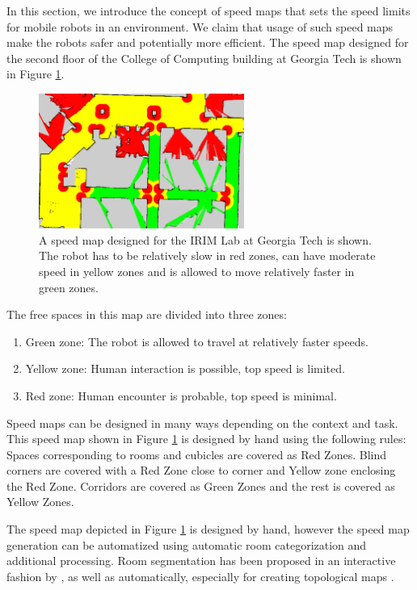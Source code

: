 In this section, we introduce the concept of speed maps that sets the speed limits for mobile robots in an environment. We claim that usage of such speed maps make the robots safer and potentially more efficient. The speed map designed for the second floor of the College of Computing building at Georgia Tech is shown in Figure \ref{fig:speed_map_irim}.

\begin{figure}[ht!]
\centering
\includegraphics[width=0.6\textwidth]{pics/intro}
\caption{A speed map designed for the IRIM Lab at Georgia Tech is shown. The robot has to be relatively slow in red zones, can have moderate speed in yellow zones and is allowed to move relatively faster in green zones.}
\label{fig:speed_map_irim}
\end{figure}

The free spaces in this map are divided into three zones:
\begin{enumerate}
\item Green zone: The robot is allowed to travel at relatively faster speeds.
\item Yellow zone: Human interaction is possible, top speed is limited.
\item Red zone: Human encounter is probable, top speed is minimal.
\end{enumerate}

Speed maps can be designed in many ways depending on the context and task. This speed map shown in Figure \ref{fig:speed_map_irim} is designed by hand using the following rules: Spaces corresponding to rooms and cubicles are covered as Red Zones. Blind corners are covered with a Red Zone close to corner and Yellow zone enclosing the Red Zone. Corridors are covered as Green Zones and the rest is covered as Yellow Zones. 

The speed map depicted in Figure \ref{fig:speed_map_irim} is designed by hand, however the speed map generation can be automatized using automatic room categorization and additional processing. Room segmentation has been proposed in an interactive fashion by \cite{diosi2005interactive}, as well as automatically, especially for creating topological maps \cite{mozos2007supervised}.

